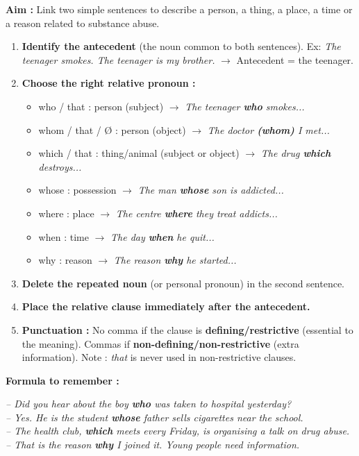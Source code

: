 \documentclass[11pt]{article}
\newcommand{\cle}[1]{{\popxbold\color{popdark}#1}}
\begin{document}
\begin{methode}
\textbf{Aim :} Link two simple sentences to describe a person, a thing, a place, a time or a reason related to substance abuse.
\begin{enumerate}
    \item \textbf{Identify the antecedent} (the noun common to both sentences). Ex: \textit{The teenager smokes. The teenager is my brother.} $\rightarrow$ Antecedent = \cle{the teenager}.
    \item \textbf{Choose the right relative pronoun :}
    \begin{itemize}
        \item \cle{who} / \cle{that} : person (subject) $\rightarrow$ \textit{The teenager \textbf{who} smokes...}
        \item \cle{whom} / \cle{that} / \cle{\O} : person (object) $\rightarrow$ \textit{The doctor \textbf{(whom)} I met...}
        \item \cle{which} / \cle{that} : thing/animal (subject or object) $\rightarrow$ \textit{The drug \textbf{which} destroys...}
        \item \cle{whose} : possession $\rightarrow$ \textit{The man \textbf{whose} son is addicted...}
        \item \cle{where} : place $\rightarrow$ \textit{The centre \textbf{where} they treat addicts...}
        \item \cle{when} : time $\rightarrow$ \textit{The day \textbf{when} he quit...}
        \item \cle{why} : reason $\rightarrow$ \textit{The reason \textbf{why} he started...}
    \end{itemize}
    \item \textbf{Delete the repeated noun} (or personal pronoun) in the second sentence.
    \item \textbf{Place the relative clause immediately after the antecedent.}
    \item \textbf{Punctuation :} No comma if the clause is \textbf{defining/restrictive} (essential to the meaning). Commas if \textbf{non-defining/non-restrictive} (extra information). Note : \textit{that} is never used in non-restrictive clauses.
\end{enumerate}
\textbf{Formula to remember :} 
\end{methode}

\begin{exemplebox}
\textit{-- Did you hear about the boy \textbf{who} was taken to hospital yesterday?}\\
\textit{-- Yes. He is the student \textbf{whose} father sells cigarettes near the school.}\\
\textit{-- The health club, \textbf{which} meets every Friday, is organising a talk on drug abuse.}\\
\textit{-- That is the reason \textbf{why} I joined it. Young people need information.}
\end{exemplebox}
\end{document}

